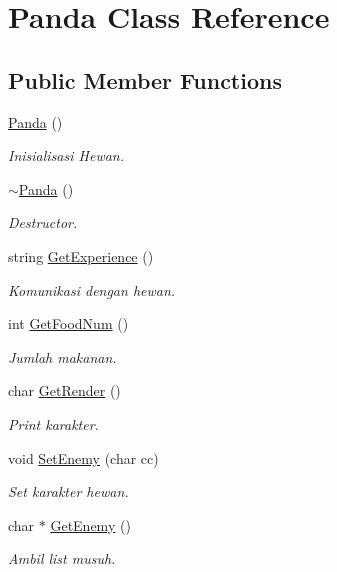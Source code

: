 \hypertarget{class_panda}{}\section{Panda Class Reference}
\label{class_panda}
\subsection*{Public Member Functions}
\begin{DoxyCompactItemize}
\item 
\hyperlink{class_panda_a489fdb1f4fe88f0c0c99a3f0768212b4}{Panda} ()\hypertarget{class_panda_a489fdb1f4fe88f0c0c99a3f0768212b4}{}\label{class_panda_a489fdb1f4fe88f0c0c99a3f0768212b4}

\begin{DoxyCompactList}\small\item\em Inisialisasi Hewan. \end{DoxyCompactList}\item 
\hyperlink{class_panda_add10a4e37497561bd2b2d8960ab2c1f4}{$\sim$\+Panda} ()\hypertarget{class_panda_add10a4e37497561bd2b2d8960ab2c1f4}{}\label{class_panda_add10a4e37497561bd2b2d8960ab2c1f4}

\begin{DoxyCompactList}\small\item\em Destructor. \end{DoxyCompactList}\item 
string \hyperlink{class_panda_a3d32a3e47b26f14aa4acdf527229bb90}{Get\+Experience} ()\hypertarget{class_panda_a3d32a3e47b26f14aa4acdf527229bb90}{}\label{class_panda_a3d32a3e47b26f14aa4acdf527229bb90}

\begin{DoxyCompactList}\small\item\em Komunikasi dengan hewan. \end{DoxyCompactList}\item 
int \hyperlink{class_panda_a5454661520ddc6513b837be57c559ef7}{Get\+Food\+Num} ()
\begin{DoxyCompactList}\small\item\em Jumlah makanan. \end{DoxyCompactList}\item 
char \hyperlink{class_panda_ae5bb7390f113b8287bb483c53c6b3819}{Get\+Render} ()
\begin{DoxyCompactList}\small\item\em Print karakter. \end{DoxyCompactList}\item 
void \hyperlink{class_panda_a880b743b82b1fad6e098cb1eec2b0cfa}{Set\+Enemy} (char cc)
\begin{DoxyCompactList}\small\item\em Set karakter hewan. \end{DoxyCompactList}\item 
char $\ast$ \hyperlink{class_panda_ab5720b79993b57f7aab5128144f74357}{Get\+Enemy} ()
\begin{DoxyCompactList}\small\item\em Ambil list musuh. \end{DoxyCompactList}\end{DoxyCompactItemize}
